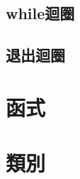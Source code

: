 \documentclass{article}
\begin{document}
\begin{large}
    
    
        \subsection{while迴圈}
    
    
        \subsection{退出迴圈}
    
    
    \section{函式}
    
    
        \subsection{}
    
    
    \section{類別}
    
    
        \subsection{}
    
    
\end{large}
\end{document}
